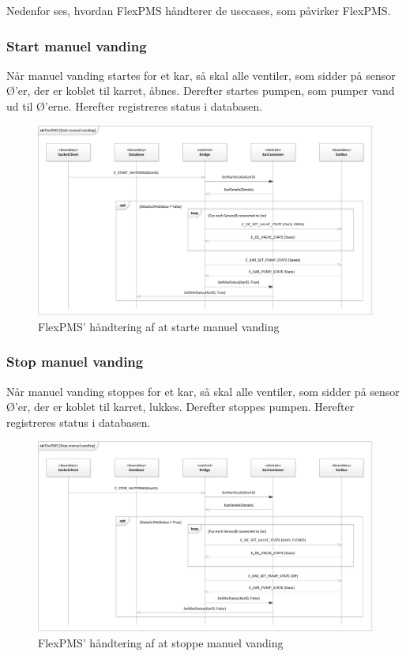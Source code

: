 Nedenfor ses, hvordan FlexPMS håndterer de usecases, som påvirker FlexPMS.

\subsubsection{Start manuel vanding}

Når manuel vanding startes for et kar, så skal alle ventiler, som sidder på sensor Ø'er, der er koblet til karret, åbnes. Derefter startes pumpen, som pumper vand ud til Ø'erne. Herefter registreres status i databasen.

\begin{figure}[H]
	\centering
	\includegraphics[scale=.6]{SoftwareArkitektur/FlexPMS/Diagrammer/Case_StartManuelVanding.png}
	\caption{FlexPMS' håndtering af at starte manuel vanding}
	\label{photo:OpenOValveUseCase}
\end{figure}


\subsubsection{Stop manuel vanding}

Når manuel vanding stoppes for et kar, så skal alle ventiler, som sidder på sensor Ø'er, der er koblet til karret, lukkes. Derefter stoppes pumpen. Herefter registreres status i databasen.

\begin{figure}[H]
	\centering
	\includegraphics[scale=.6]{SoftwareArkitektur/FlexPMS/Diagrammer/Case_StopManuelVanding.png}
	\caption{FlexPMS' håndtering af at stoppe manuel vanding}
	\label{photo:OpenOValveUseCase}
\end{figure}


